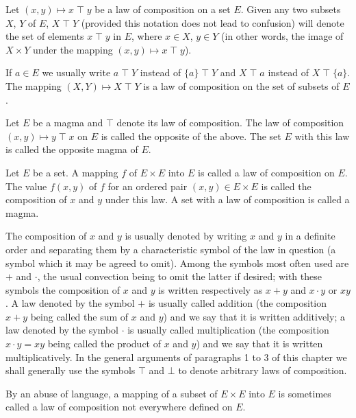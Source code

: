 \documentclass[twoside,usebookdim]{bourbaki}
\begin{document}
Let $(x,y)\mapsto x\mathbin{\top} y$ be a law of composition on a set $E$. Given
any two subsets $X$, $Y$ of $E$, $X \mathbin{\top} Y$ (provided this notation does
not lead to confusion) will denote the set of elements $x\mathbin{\top} y$ in $E$,
where $x\in X$, $y\in Y$ (in other words, the image of $X\times Y$ under
the mapping $(x,y)\mapsto x\mathbin{\top} y$).

If $a\in E$ we usually write $a\mathbin{\top} Y$ instead of $\{a\}\mathbin{\top} Y$ and
$X\mathbin{\top} a$ instead of $X\mathbin{\top}\{a\}$. The mapping $(X, Y)\mapsto X\mathbin{\top} Y$
is a law of composition on the set of subsets of $E$.

\begin{definition}
Let $E$ be a magma and $\mathbin{\top}$ denote its law of composition. The law of
composition $(x, y)\mapsto y\mathbin{\top} x$ on $E$ is called the opposite of the
above. The set $E$ with this law is called the opposite magma of $E$.
\end{definition}

\begin{definition}
Let $E$ be a set. A mapping $f$ of $E\times E$ into $E$ is called a law
of composition on $E$. The value $f(x,y)$ of $f$ for an ordered pair
$(x,y)\in E\times E$ is called the composition of $x$ and $y$ under this
law. A set with a law of composition is called a magma.
\end{definition}

The composition of $x$ and $y$ is usually denoted by writing $x$ and $y$
in a definite order and separating them by a characteristic symbol of
the law in question (a symbol which it may be agreed to omit). Among the
symbols most often used are $+$ and $\cdot$, the usual convection being
to omit the latter if desired; with these symbols the composition of $x$
and $y$ is written respectively as $x + y$ and $x\cdot y$ or $xy$.
A law denoted by the symbol $+$ is usually called addition (the
composition $x + y$ being called the sum of $x$ and $y$) and we say that
it is written additively; a law denoted by the symbol $\cdot$ is usually
called multiplication (the composition $x\cdot y = xy$ being called the
product of $x$ and $y$) and we say that it is written
multiplicatively. In the general arguments of paragraphs 1 to 3 of this
chapter we shall generally use the symbols $\mathbin{\top}$ and $\bot$ to denote
arbitrary laws of composition.

By an abuse of language, a mapping of a subset of $E\times E$ into $E$
is sometimes called a law of composition not everywhere defined on $E$.
\end{document}
